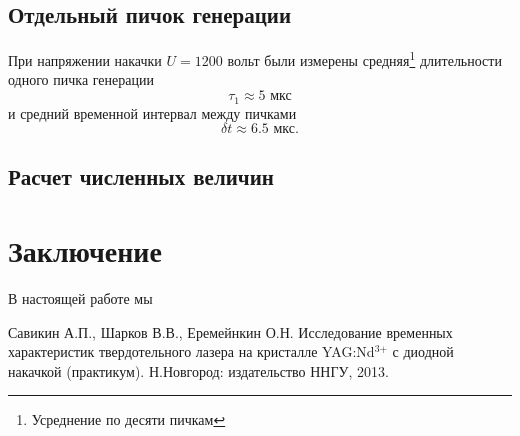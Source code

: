 \documentclass[a4paper,14pt]{extarticle}
\begin{document}
\subsection{Отдельный пичок генерации}

При напряжении накачки $U=1200$ вольт были измерены средняя\footnote{Усреднение по десяти пичкам} длительности одного пичка генерации
\begin{equation}
  \tau_1 \approx 5\text{ мкс}
\end{equation}
и средний временной интервал между пичками
\begin{equation}
  \delta t \approx 6.5\text{ мкс}.
\end{equation}
\subsection{Расчет численных величин}


\section*{Заключение}
В настоящей работе мы 

\begin{thebibliography}{}

   Савикин А.П., Шарков В.В., Еремейнкин О.Н. Исследование временных характеристик твердотельного лазера на кристалле  YAG:Nd${}^{{3\texttt{+}}}$ с диодной накачкой (практикум). Н.Новгород: издательство ННГУ, 2013.

\end{thebibliography}
\end{document}
